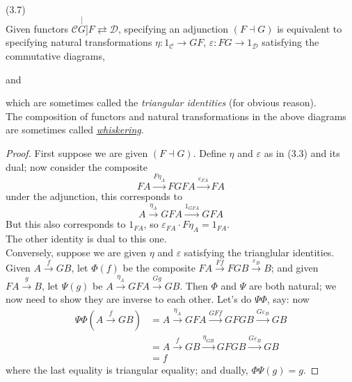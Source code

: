 \documentclass[a4paper]{article}
\begin{document}
\begin{thm} (3.7)\\
    Given functors $\mathcal{C} \stackrel[G]{F}{\rightleftarrows} \mathcal{D}$, specifying an adjunction $(F \dashv G)$ is equivalent to specifying natural transformations $\eta: 1_{\mathcal{C}} \to GF$, $\varepsilon:FG \to 1_{\mathcal{D}}$ satisfying the commutative diagrams,

    and

    which are sometimes called the \emph{triangular identities} (for obvious reason).\\
    The composition of functors and natural transformations in the above diagrams are sometimes called \href{https://ncatlab.org/nlab/show/whiskering}{\emph{whiskering}}.
    \begin{proof}
        First suppose we are given $(F \dashv G)$. Define $\eta$ and $\varepsilon$ as in (3.3) and its dual; now consider the composite
        $$FA \xrightarrow{F \eta_A} FGFA \xrightarrow{\varepsilon_{FA}} FA$$
        under the adjunction, this corresponds to
        $$A \xrightarrow{\eta_A} GFA \xrightarrow{1_{GFA}} GFA$$
        But this also corresponds to $1_{FA}$, so $\varepsilon_{FA} \cdot F \eta_A = 1_{FA}$.\\
        The other identity is dual to this one.\\
        Conversely, suppose we are given $\eta$ and $\varepsilon$ satisfying the trianglular identities. Given $A \xrightarrow{f} GB$, let $\Phi(f)$ be the composite $FA \xrightarrow{Ff} FGB \xrightarrow{\varepsilon_B} B$; and given $FA \xrightarrow{g} B$, let $\Psi(g)$ be $A \xrightarrow{\eta_A} GFA \xrightarrow{Gg} GB$. Then $\Phi$ and $\Psi$ are both natural; we now need to show they are inverse to each other. Let's do $\Psi\Phi$, say: now 
        \begin{equation*}
            \begin{aligned}
                \Psi\Phi(A \xrightarrow{f} GB) &= A \xrightarrow{\eta_A} GFA \xrightarrow{GFf} GFGB \xrightarrow{G\varepsilon_B} GB\\
                &= A \xrightarrow{f} GB \xrightarrow{\eta_{GB}} GFGB \xrightarrow{G \varepsilon_B} GB\\
                &= f
            \end{aligned}
        \end{equation*}
        where the last equality is triangular equality; and dually, $\Phi\Psi(g) = g$.
    \end{proof}
\end{thm}
\end{document}
